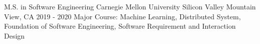 
\begin{cventries}

  \cventry
    {M.S. in Software Engineering} %
    {Carnegie Mellon University Silicon Valley} %
    {Mountain View, CA} %
    {2019 - 2020} %
    {
      Major Course: Machine Learning, Distributed System, Foundation of Software Engineering, Software Requirement and Interaction Design
    }
    



\end{cventries}

